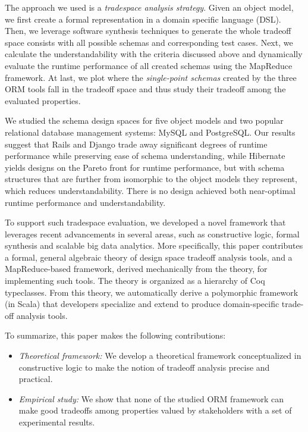 \documentclass[10pt,conference]{IEEEtran}
\begin{document}
The approach we used is a {\em tradespace analysis strategy}. Given an object model, we first create a formal representation in a domain specific language (DSL). Then, we leverage software synthesis techniques to generate the whole tradeoff space consists with all possible schemas and corresponding test cases. Next, we calculate the understandability with the criteria discussed above and dynamically evaluate the runtime performance of all created schemas using the MapReduce framework. At last, we plot where the {\em single-point schemas} created by the three ORM tools fall in the tradeoff space and thus study their tradeoff among the evaluated properties.

We studied the schema design spaces for five object models and two popular relational database management systems: MySQL and PostgreSQL. Our results suggest that Rails and Django trade away significant degrees of runtime performance while preserving ease of schema understanding, while Hibernate yields designs on the Pareto front for runtime performance, but with schema structures that are further from isomorphic to the object models they represent, which reduces understandability. There is no design achieved both near-optimal runtime performance and understandability.

To support such tradespace evaluation, we developed a novel framework that leverages recent advancements in several areas, such as constructive logic, formal synthesis and scalable big data analytics. More specifically, this paper contributes a formal, general algebraic theory of design space tradeoff analysis tools, and a MapReduce-based framework, derived mechanically from the theory, for implementing such tools. The theory is organized as a hierarchy of Coq typeclasses. From this theory, we automatically derive a polymorphic framework (in Scala) that developers specialize and extend to produce domain-specific trade-off analysis tools.

To summarize, this paper makes the following contributions:
\begin{itemize}
\item \textit{Theoretical framework:} We develop a theoretical framework conceptualized in constructive logic to make the notion of tradeoff analysis precise and practical.
\item \textit{Empirical study:} We show that none of the studied ORM framework can make good tradeoffs among properties valued by stakeholders with a set of experimental results.
\end{itemize}
\end{document}
